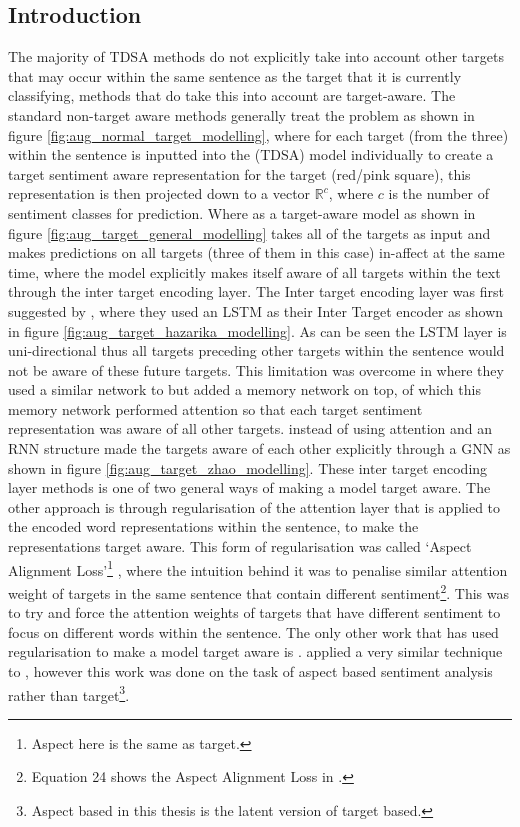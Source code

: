 \subsection{Introduction}
The majority of TDSA methods do not explicitly take into account other targets that may occur within the same sentence as the target that it is currently classifying, methods that do take this into account are target-aware. The standard non-target aware methods generally treat the problem as shown in figure \ref{fig:aug_normal_target_modelling}, where for each target (from the three) within the sentence is inputted into the (TDSA) model individually to create a target sentiment aware representation for the target (red/pink square), this representation is then projected down to a vector $\mathbb{R}^{c}$, where $c$ is the number of sentiment classes for prediction. Where as a target-aware model as shown in figure \ref{fig:aug_target_general_modelling} takes all of the targets as input and makes predictions on all targets (three of them in this case) in-affect at the same time, where the model explicitly makes itself aware of all targets within the text through the inter target encoding layer. The Inter target encoding layer was first suggested by \citet{hazarika-etal-2018-modeling}, where they used an LSTM as their Inter Target encoder as shown in figure \ref{fig:aug_target_hazarika_modelling}. As can be seen the LSTM layer is uni-directional thus all targets preceding other targets within the sentence would not be aware of these future targets. This limitation was overcome in \citet{majumder-etal-2018-iarm} where they used a similar network to \citet{hazarika-etal-2018-modeling} but added a memory network on top, of which this memory network performed attention so that each target sentiment representation was aware of all other targets. \citet{zhao2019modeling} instead of using attention and an RNN structure made the targets aware of each other explicitly through a GNN as shown in figure \ref{fig:aug_target_zhao_modelling}. These inter target encoding layer methods is one of two general ways of making a model target aware. The other approach is through regularisation of the attention layer \citep{fan-etal-2018-multi} that is applied to the encoded word representations within the sentence, to make the representations target aware. This form of regularisation was called `Aspect Alignment Loss'\footnote{Aspect here is the same as target.} \citep{fan-etal-2018-multi}, where the intuition behind it was to penalise similar attention weight of targets in the same sentence that contain different sentiment\footnote{Equation 24 shows the Aspect Alignment Loss in \citet{fan-etal-2018-multi}.}. This was to try and force the attention weights of targets that have different sentiment to focus on different words within the sentence. The only other work that has used regularisation to make a model target aware is \citet{hu-etal-2019-constrained}. \citet{hu-etal-2019-constrained} applied a very similar technique to \citet{fan-etal-2018-multi}, however this work was done on the task of aspect based sentiment analysis rather than target\footnote{Aspect based in this thesis is the latent version of target based.}.

